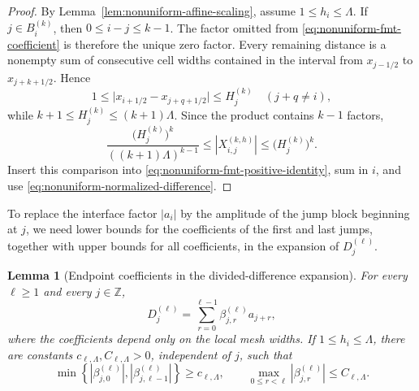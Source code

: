 \documentclass[11pt]{amsart}
\theoremstyle{plain}
\newtheorem{lemma}[theorem]{Lemma}
\theoremstyle{definition}
\theoremstyle{remark}
\numberwithin{equation}{section}
\theoremstyle{plain}
\begin{document}
\begin{proof}
	By Lemma~\ref{lem:nonuniform-affine-scaling}, assume
	$1\le h_i\le\Lambda$.  If $j\in B_i^{(k)}$, then
	$0\le i-j\le k-1$.  The factor omitted from
	\eqref{eq:nonuniform-fmt-coefficient} is therefore the unique zero factor.
	Every remaining distance is a nonempty sum of consecutive cell widths
	contained in the interval from $x_{j-1/2}$ to $x_{j+k+1/2}$.  Hence
	\[
	1\le
	\bigl|x_{i+1/2}-x_{j+q+1/2}\bigr|
	\le H_j^{(k)}
	\quad(j+q\ne i),
	\]
	while
	$k+1\le H_j^{(k)}\le(k+1)\Lambda$.  Since the product contains $k-1$
	factors,
	\begin{equation}\label{eq:nonuniform-X-comparison}
		\frac{\bigl(H_j^{(k)}\bigr)^k}
		{((k+1)\Lambda)^{k-1}}
		\le
		|X_{i,j}^{(k,h)}|
		\le
		\bigl(H_j^{(k)}\bigr)^k.
	\end{equation}
	Insert this comparison into
	\eqref{eq:nonuniform-fmt-positive-identity}, sum in $i$, and use
	\eqref{eq:nonuniform-normalized-difference}.
\end{proof}

To replace the interface factor $|a_i|$ by the amplitude of the jump block
beginning at $j$, we need lower bounds for the coefficients of the first
and last jumps, together with upper bounds for all coefficients, in the
expansion of $D_j^{(\ell)}$.

\begin{lemma}[Endpoint coefficients in the divided-difference expansion]
	\label{lem:nonuniform-endpoint-coefficients}
	For every $\ell\ge1$ and every $j\in\mathbb Z$,
	\begin{equation}\label{eq:nonuniform-endpoint-expansion}
		D_j^{(\ell)}
		=
		\sum_{r=0}^{\ell-1}
		\beta_{j,r}^{(\ell)}a_{j+r},
	\end{equation}
	where the coefficients depend only on the local mesh widths.  If
	$1\le h_i\le\Lambda$, there are constants
	$c_{\ell,\Lambda},C_{\ell,\Lambda}>0$, independent of $j$, such that
	\begin{equation}\label{eq:nonuniform-endpoint-coefficient-bounds}
		\min\left\{
		|\beta_{j,0}^{(\ell)}|,
		|\beta_{j,\ell-1}^{(\ell)}|
		\right\}
		\ge c_{\ell,\Lambda},
		\qquad
		\max_{0\le r<\ell}|\beta_{j,r}^{(\ell)}|
		\le C_{\ell,\Lambda}.
	\end{equation}
\end{lemma}
\end{document}
